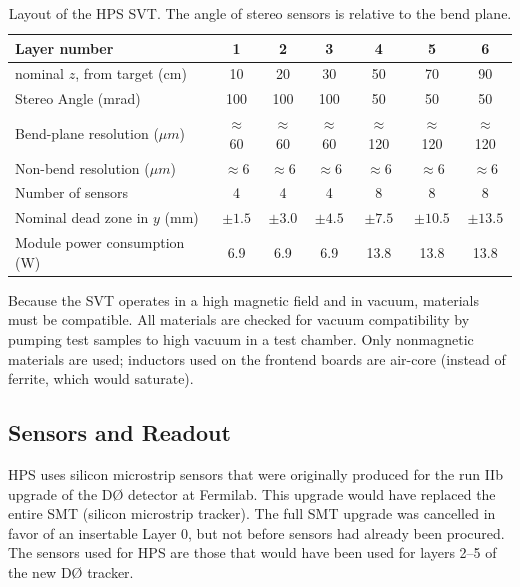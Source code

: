 \begin{table}[htp]
    \begin{center}
        \caption{Layout of the HPS SVT.  The angle of stereo sensors is relative to the bend plane.}
        \begin{tabular}{lcccccc}   
            \hline \hline 
            Layer number & 1 & 2 & 3 & 4 & 5 & 6 \\      
            \hline
            nominal $z$, from target (cm)  & 10 & 20 & 30 & 50 & 70  & 90 \\ 
            Stereo Angle (mrad)  & 100 & 100 & 100 & 50 & 50 & 50 \\ 
            Bend-plane resolution ($\mu m$)  & $\approx$60 & $\approx$60 & $\approx$60 & $\approx$120 & $\approx$120 & $\approx$120 \\ 
            Non-bend resolution ($\mu m$)  & $\approx$6 & $\approx$6 & $\approx$6 & $\approx$6 & $\approx$6  & $\approx$6 \\ 
            Number of sensors  & 4 & 4 & 4 & 8 & 8 & 8 \\ 
            Nominal dead zone in $y$ (mm)  & $\pm1.5$  & $\pm3.0$  & $\pm4.5$  & $\pm7.5$  & $\pm10.5$ & $\pm13.5$  \\ 
            Module power consumption (W) & 6.9 & 6.9 & 6.9 & 13.8 & 13.8 & 13.8 \\
            \hline \hline
        \end{tabular}
        \label{tab:svt_layout} 
    \end{center}
\end{table}

Because the SVT operates in a high magnetic field and in vacuum, materials must be compatible.
All materials are checked for vacuum compatibility by pumping test samples to high vacuum in a test chamber.
Only nonmagnetic materials are used; inductors used on the frontend boards are air-core (instead of ferrite, which would saturate).

\subsection{Sensors and Readout}
HPS uses silicon microstrip sensors that were originally produced for the run IIb upgrade of the D{\O} detector at Fermilab.
This upgrade would have replaced the entire SMT (silicon microstrip tracker).
The full SMT upgrade was cancelled in favor of an insertable Layer 0, but not before sensors had already been procured.
The sensors used for HPS are those that would have been used for layers 2--5 of the new D{\O} tracker.

